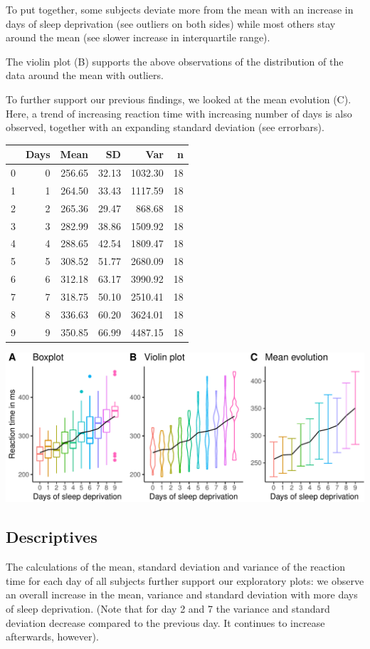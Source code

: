 \documentclass[
]{article}
\begin{document}
To put together, some subjects deviate more from the mean with an
increase in days of sleep deprivation (see outliers on both sides) while
most others stay around the mean (see slower increase in interquartile
range).

The violin plot (B) supports the above observations of the distribution
of the data around the mean with outliers.

To further support our previous findings, we looked at the mean
evolution (C). Here, a trend of increasing reaction time with increasing
number of days is also observed, together with an expanding standard
deviation (see errorbars).

\begin{longtable}[]{@{}lrrrrr@{}}
\toprule
& Days & Mean & SD & Var & n\tabularnewline
\midrule
\endhead
0 & 0 & 256.65 & 32.13 & 1032.30 & 18\tabularnewline
1 & 1 & 264.50 & 33.43 & 1117.59 & 18\tabularnewline
2 & 2 & 265.36 & 29.47 & 868.68 & 18\tabularnewline
3 & 3 & 282.99 & 38.86 & 1509.92 & 18\tabularnewline
4 & 4 & 288.65 & 42.54 & 1809.47 & 18\tabularnewline
5 & 5 & 308.52 & 51.77 & 2680.09 & 18\tabularnewline
6 & 6 & 312.18 & 63.17 & 3990.92 & 18\tabularnewline
7 & 7 & 318.75 & 50.10 & 2510.41 & 18\tabularnewline
8 & 8 & 336.63 & 60.20 & 3624.01 & 18\tabularnewline
9 & 9 & 350.85 & 66.99 & 4487.15 & 18\tabularnewline
\bottomrule
\end{longtable}

\begin{center}\includegraphics{common_sleep_files/figure-latex/boxplot-1} \end{center}

\hypertarget{descriptives}{%
\subsection{Descriptives}\label{descriptives}}

The calculations of the mean, standard deviation and variance of the
reaction time for each day of all subjects further support our
exploratory plots: we observe an overall increase in the mean, variance
and standard deviation with more days of sleep deprivation. (Note that
for day 2 and 7 the variance and standard deviation decrease compared to
the previous day. It continues to increase afterwards, however).
\end{document}
